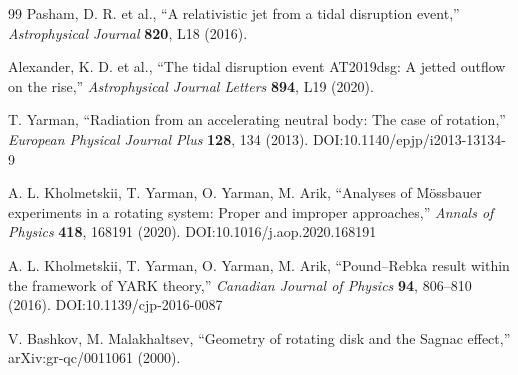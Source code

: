\documentclass[12pt,a4paper]{article}
\begin{document}
\begin{thebibliography}{99}
		Pasham, D. R. et al., ``A relativistic jet from a tidal disruption event,'' \emph{Astrophysical Journal} \textbf{820}, L18 (2016).
		
		Alexander, K. D. et al., ``The tidal disruption event AT2019dsg: A jetted outflow on the rise,'' \emph{Astrophysical Journal Letters} \textbf{894}, L19 (2020).
		
		T. Yarman, ``Radiation from an accelerating neutral body: The case of rotation,'' \emph{European Physical Journal Plus} \textbf{128}, 134 (2013). DOI:10.1140/epjp/i2013-13134-9
		
		A. L. Kholmetskii, T. Yarman, O. Yarman, M. Arik, ``Analyses of Mössbauer experiments in a rotating system: Proper and improper approaches,'' \emph{Annals of Physics} \textbf{418}, 168191 (2020). DOI:10.1016/j.aop.2020.168191
		
		A. L. Kholmetskii, T. Yarman, O. Yarman, M. Arik, ``Pound–Rebka result within the framework of YARK theory,'' \emph{Canadian Journal of Physics} \textbf{94}, 806–810 (2016). DOI:10.1139/cjp-2016-0087
		
		V. Bashkov, M. Malakhaltsev, ``Geometry of rotating disk and the Sagnac effect,'' arXiv:gr-qc/0011061 (2000).
	\end{thebibliography}
	
\end{document}
